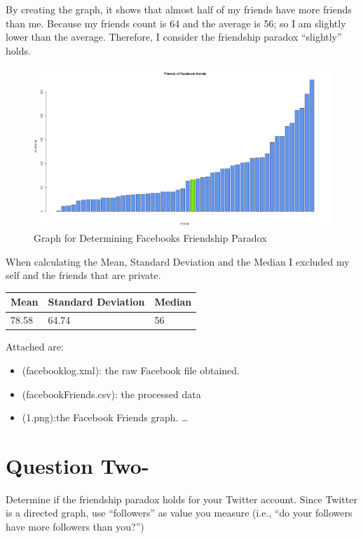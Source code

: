 \documentclass[letterpaper,11pt]{article}
\begin{document}
By creating the graph, it shows that almost half of my friends have more friends than me. Because my friends count is 64 and the average is 56; so I am slightly lower than the average. Therefore, I consider the friendship paradox “slightly” holds.


\begin{figure}[!ht]
\centering
\includegraphics[width=1\textwidth]{1.png}
\caption{Graph for Determining Facebooks Friendship Paradox}
\label{fig:Graph for Determining Friendship Paradox}
\end{figure}


When calculating the Mean, Standard Deviation and the Median I excluded my self and the friends that are private.
\begin{table}[H]
    \begin{tabular}{|| l || l || l ||}\hline
    Mean & Standard Deviation & Median \\\hline
    78.58  & 64.74 & 56 \\\hline
    \end{tabular}
\end{table}
Attached are:
\begin{itemize}
\item (facebooklog.xml): the raw Facebook file obtained.\\
\item (facebookFriends.csv): the processed data
\item (1.png):the Facebook Friends graph.
\ldots
\end{itemize}

\pagebreak
\section*{Question Two-}

Determine if the friendship paradox holds for your Twitter account. Since Twitter is a directed graph, use ``followers'' as value you measure (i.e., ``do your followers have more followers than you?'') \\
\end{document}

